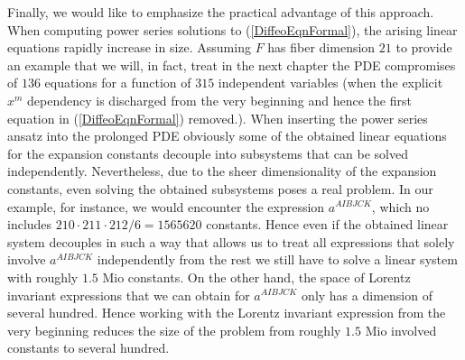 Finally, we would like to emphasize the practical advantage of this approach. When computing power series solutions to (\ref{DiffeoEqnFormal}), the arising linear equations rapidly increase in size. Assuming $F$ has fiber dimension $21$ to provide an example that we will, in fact, treat in the next chapter the PDE compromises of $136$ equations for a function of $315$ independent variables (when the explicit $x^m$ dependency is discharged from the very beginning and hence the first equation in (\ref{DiffeoEqnFormal}) removed.).  When inserting the power series ansatz into the prolonged PDE obviously some of the obtained linear equations for the expansion constants decouple into subsystems that can be solved independently. Nevertheless, due to the sheer dimensionality of the expansion constants, even solving the obtained subsystems poses a real problem. In our example, for instance, we would encounter the expression $a^{AIBJCK}$, which no includes $210\cdot 211\cdot212/6=1565620$ constants. Hence even if the obtained linear system decouples in such a way that allows us to treat all expressions that solely involve $a^{AIBJCK}$ independently from the rest we still have to solve a linear system with roughly $1.5$ Mio constants. On the other hand, the space of Lorentz invariant expressions that we can obtain for $a^{AIBJCK}$ only has a dimension of several hundred. Hence working with the Lorentz invariant expression from the very beginning reduces the size of the problem from roughly $1.5$ Mio involved constants to several hundred. 

